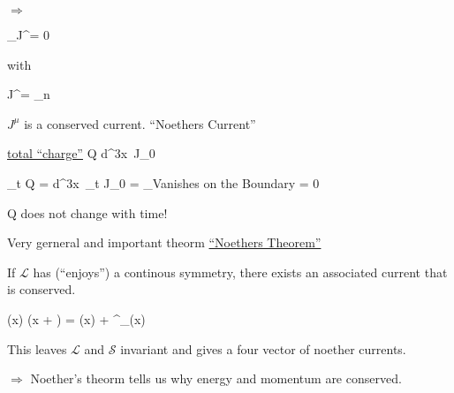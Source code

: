 {$\Rightarrow$

\be
\partial_\mu J^\mu = 0
\ee

with 

\be
J^\mu = \sum_n 
\ee

$J^\mu$ is a conserved current.  ``Noethers Current''


\underline{total ``charge''}
\be
Q \equiv \int d^3x\ J_0 
\ee


\be
\partial_t Q = \int d^3x\ \partial_t J_0 = _{\textrm{Vanishes on the Boundary}} = 0
\ee
 
Q does not change with time! 

Very gerneral and important theorm \underline{``Noethers Theorem''}

If $\mathcal{L}$ has (``enjoys'') a continous symmetry, there exists an associated current that is conserved. 

\be
\phi(x) \rightarrow \phi(x + \epsilon) = \phi(x) + \epsilon^\mu \partial_\mu \phi(x)
\ee

This leaves $\mathcal{L}$ and $\mathcal{S}$ invariant and gives a four vector of noether currents. 

$\Rightarrow$ Noether's theorm tells us why energy and momentum are conserved. 






}




